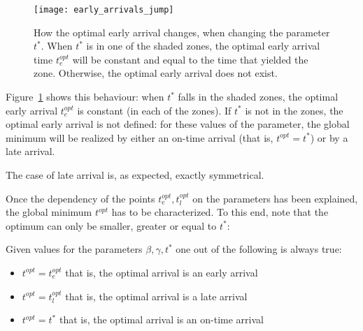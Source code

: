 \begin{figure}
  \centering
  \texttt{[image: early\_arrivals\_jump]}
  \caption{How the optimal early arrival changes,
    when changing the parameter \(t^*\).
    When \(t^*\) is in one of the shaded zones,
    the optimal early arrival time \(t_e^{opt}\) will be constant and equal to the time that yielded the zone.
  Otherwise, the optimal early arrival does not exist.}
  \label{fig:early_arrivals_jump}
\end{figure}

Figure~\ref{fig:early_arrivals_jump} shows this behaviour:
when \(t^*\) falls in the shaded zones,
the optimal early arrival \(t_e^{opt}\) is constant (in each of the zones).
If \(t^*\) is not in the zones,
the optimal early arrival is not defined:
for these values of the parameter,
the global minimum will be realized by either an on-time arrival (that is, \(t^{opt} = t^*\))
or by a late arrival.

The case of late arrival is, as expected, exactly symmetrical.

Once the dependency of the points \(t_e^{opt}, t_l^{opt}\) on the parameters has been explained,
the global minimum \(t^{opt}\) has to be characterized.
To this end, note that the optimum can only be smaller, greater or equal to \(t^*\):
\begin{obs}
  \label{obs:t_opt-dep}
  Given values for the parameters \(\beta, \gamma, t^*\) one out of the following is always true:
  \begin{itemize}
  \item \(t^{opt} = t_e^{opt}\) that is, the optimal arrival is an early arrival
  \item \(t^{opt} = t_l^{opt}\) that is, the optimal arrival is a late arrival
  \item \(t^{opt} = t^*\) that is, the optimal arrival is an on-time arrival
  \end{itemize}
\end{obs}

